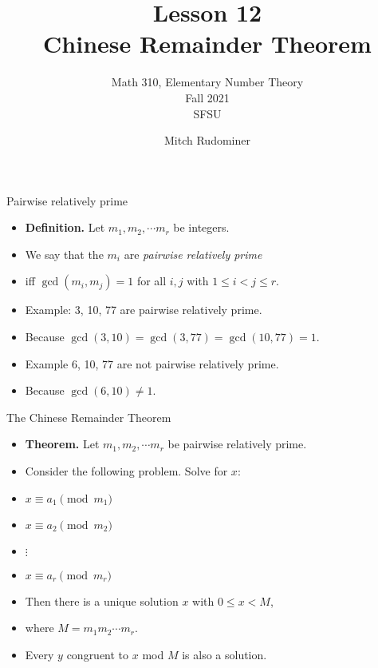 \documentclass[handout]{beamer}
\title{Lesson 12 \\ Chinese Remainder Theorem}
\subtitle{Math 310, Elementary Number Theory \\ Fall 2021 \\ SFSU}
\author{Mitch Rudominer}
\date{}
\begin{document}
\begin{frame}
  \titlepage
\end{frame}

\begin{frame}{Pairwise relatively prime}

\begin{itemize}
  \item \textbf{Definition.} Let $m_1, m_2, \cdots m_r$  be integers.
  \item We say that the $m_i$ are \emph{pairwise relatively prime}
  \item iff $\gcd(m_i,m_j)=1$ for all $i,j$ with $1\leq i < j \leq r$.
  \item Example: 3, 10, 77 are pairwise relatively prime.
  \item Because $\gcd(3,10) = \gcd(3,77)=\gcd(10,77) = 1$.
  \item Example 6, 10, 77 are not pairwise relatively prime.
  \item Because $\gcd(6,10)\not=1$.
\end{itemize}

\end{frame}


\begin{frame}{The Chinese Remainder Theorem}

\begin{itemize}
  \item \textbf{Theorem.} Let $m_1, m_2, \cdots m_r$  be pairwise relatively prime.
  \item Consider the following problem. Solve for $x$:
  \item $x \equiv a_1 \pmod {m_1}$
  \item $x \equiv a_2 \pmod {m_2}$
  \item $\vdots$
  \item $x \equiv a_r \pmod {m_r}$
  \item Then there is a unique solution $x$ with $0\leq x < M$,
  \item where $M=m_1 m_2 \cdots m_r$.
  \item Every $y$ congruent to $x$ mod $M$ is also a solution.
\end{itemize}

\end{frame}
\end{document}
